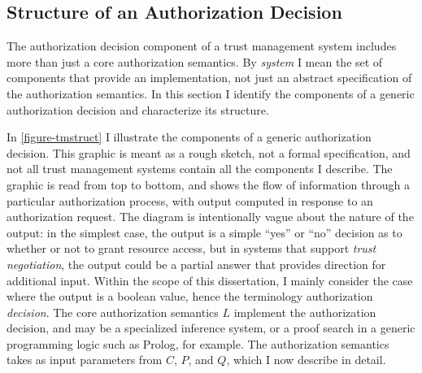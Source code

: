 %
%
%
%
%
%
%
%


\subsection{Structure of an Authorization Decision}
\label{section-components-structure}

The authorization decision component of a trust management system includes more than just a core
authorization semantics. By \emph{system} I mean the set of components that provide an
implementation, not just an abstract specification of the authorization semantics. In this
section I identify the components of a generic authorization decision and characterize its
structure.

In \autoref{figure-tmstruct} I illustrate the components of a generic authorization decision.
This graphic is meant as a rough sketch, not a formal specification, and not all trust
management systems contain all the components I describe. The graphic is read from top to
bottom, and shows the flow of information through a particular authorization process, with
output computed in response to an authorization request. The diagram is intentionally vague
about the nature of the output: in the simplest case, the output is a simple ``yes'' or ``no''
decision as to whether or not to grant resource access, but in systems that support \emph{trust
  negotiation}, the output could be a partial answer that provides direction for additional
input. Within the scope of this dissertation, I mainly consider the case where the output is a
boolean value, hence the terminology authorization \emph{decision}. The core authorization
semantics $L$ implement the authorization decision, and may be a specialized inference system,
or a proof search in a generic programming logic such as Prolog, for example. The authorization
semantics takes as input parameters from $C$, $P$, and $Q$, which I now describe in detail.

